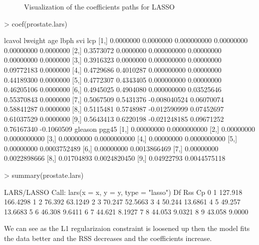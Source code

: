 \documentclass[a4paper]{article}
\begin{document}
\begin{itemize}
\begin{figure}[H]
\begin{center}
\caption{Visualization of the coefficients paths for LASSO}
\end{center}
\end{figure}
\begin{Schunk}
\begin{Sinput}
> coef(prostate.lars)	
\end{Sinput}
\begin{Soutput}
         lcavol   lweight          age       lbph        svi        lcp
 [1,] 0.0000000 0.0000000  0.000000000 0.00000000 0.00000000  0.0000000
 [2,] 0.3573072 0.0000000  0.000000000 0.00000000 0.00000000  0.0000000
 [3,] 0.3916323 0.0000000  0.000000000 0.00000000 0.09772183  0.0000000
 [4,] 0.4729686 0.4010287  0.000000000 0.00000000 0.44189300  0.0000000
 [5,] 0.4772307 0.4343405  0.000000000 0.00000000 0.46205106  0.0000000
 [6,] 0.4945025 0.4904080  0.000000000 0.03525646 0.55370843  0.0000000
 [7,] 0.5067509 0.5431376 -0.008040524 0.06070074 0.58841287  0.0000000
 [8,] 0.5115481 0.5748987 -0.012590999 0.07452697 0.61037529  0.0000000
 [9,] 0.5643413 0.6220198 -0.021248185 0.09671252 0.76167340 -0.1060509
         gleason        pgg45
 [1,] 0.00000000 0.0000000000
 [2,] 0.00000000 0.0000000000
 [3,] 0.00000000 0.0000000000
 [4,] 0.00000000 0.0000000000
 [5,] 0.00000000 0.0003752489
 [6,] 0.00000000 0.0013866469
 [7,] 0.00000000 0.0022898666
 [8,] 0.01704893 0.0024820450
 [9,] 0.04922793 0.0044575118
\end{Soutput}
\begin{Sinput}
> summary(prostate.lars)
\end{Sinput}
\begin{Soutput}
LARS/LASSO
Call: lars(x = x, y = y, type = "lasso")
  Df     Rss       Cp
0  1 127.918 166.4298
1  2  76.392  63.1249
2  3  70.247  52.5663
3  4  50.244  13.6861
4  5  49.257  13.6683
5  6  46.308   9.6411
6  7  44.621   8.1927
7  8  44.053   9.0321
8  9  43.058   9.0000
\end{Soutput}
\end{Schunk}
We can see as the L1 regularizaion constraint is loosened up then the model
fits the data better and the RSS decreases and the coefficients increase.


\end{itemize}
\end{document}
